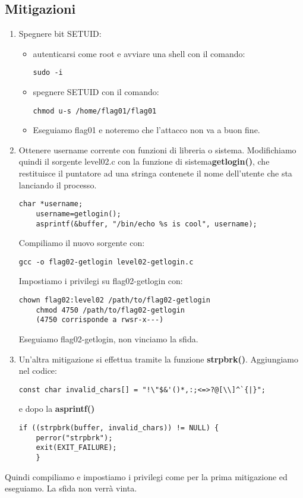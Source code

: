 \subsection{Mitigazioni}
\begin{enumerate}
    \item Spegnere bit SETUID:
    \begin{itemize}
        \item autenticarsi come root e avviare una shell con il comando: \begin{lstlisting}[style=bashstyle] 
        sudo -i
        \end{lstlisting}
        \item spegnere SETUID con il comando: \begin{lstlisting}[style=bashstyle] 
        chmod u-s /home/flag01/flag01
        \end{lstlisting}   
        \item Eseguiamo flag01 e noteremo che l’attacco non va a buon fine. 
    \end{itemize}
    \item Ottenere username corrente con funzioni di libreria o sistema. Modifichiamo quindi il sorgente level02.c con la funzione di sistema\textbf{getlogin()}, che restituisce il puntatore ad una stringa contenete il nome dell’utente che sta lanciando il processo.
    \begin{lstlisting}[style=cstyle]
    char *username; 
    username=getlogin(); 
    asprintf(&buffer, "/bin/echo %s is cool", username);
    \end{lstlisting}
    Compiliamo il nuovo sorgente con:
    \begin{lstlisting}[style=bashstyle]
    gcc -o flag02-getlogin level02-getlogin.c
    \end{lstlisting}
    Impostiamo i privilegi su flag02-getlogin con:
    \begin{lstlisting}[style=bashstyle]
    chown flag02:level02 /path/to/flag02-getlogin 
    chmod 4750 /path/to/flag02-getlogin
    (4750 corrisponde a rwsr-x---)
    \end{lstlisting}
    Eseguiamo flag02-getlogin, non vinciamo la sfida.
    \item Un’altra mitigazione si effettua tramite la funzione \textbf{strpbrk()}. Aggiungiamo nel codice:
    \begin{lstlisting}[style=cstyle]
    const char invalid_chars[] = "!\"$&'()*,:;<=>?@[\\]^`{|}";
    \end{lstlisting}
    e dopo la \textbf{asprintf()}
    \begin{lstlisting}[style=cstyle]
    if ((strpbrk(buffer, invalid_chars)) != NULL) { 
    perror("strpbrk"); 
    exit(EXIT_FAILURE); 
    }
    \end{lstlisting}
\end{enumerate}
Quindi compiliamo e impostiamo i privilegi come per la prima mitigazione ed eseguiamo. La sfida non verrà vinta.

